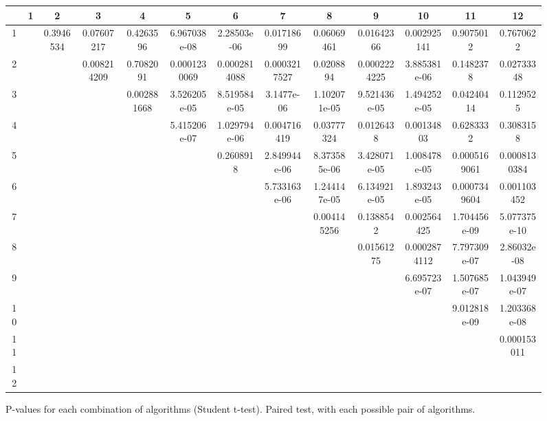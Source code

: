 \begin{landscape}
\begin{figure}
\begin{center}
	\begin{tabular}{|c|c|c|c|c|c|c|c|c|c|c|c|c|} \hline
		& 1 & 2 & 3 & 4 & 5 & 6 & 7 & 8 & 9 & 10 & 11 & 12 \\ \hline \hline
		1 & & 0.3946534 & 0.07607217 & 0.4263596 & 6.967038e-08 & 2.28503e-06 & 0.01718699 & 0.06069461 & 0.01642366 & 0.002925141 & 0.9075012 & 0.7670622 \\ \hline
		2 & & & 0.008214209 & 0.7082091 & 0.0001230069 & 0.0002814088 & 0.0003217527 & 0.0208894 & 0.0002224225 & 3.885381e-06 & 0.1482378 & 0.02733348 \\ \hline
		3 & & & & 0.002881668 & 3.526205e-05 & 8.519584e-05 & 3.1477e-06 & 1.102071e-05 & 9.521436e-05 & 1.494252e-05 & 0.04240414 & 0.1129525 \\ \hline
		4 & & & & & 5.415206e-07 & 1.029794e-06 & 0.004716419 & 0.03777324 & 0.0126438 & 0.00134803 & 0.6283332 & 0.3083158 \\ \hline
		5 & & & & & & 0.2608918 & 2.849944e-06 & 8.373585e-06 & 3.428071e-05 & 1.008478e-05 & 0.0005169061 & 0.0008130384 \\ \hline
		6 & & & & & & & 5.733163e-06 & 1.244147e-05 & 6.134921e-05 & 1.893243e-05 & 0.0007349604 & 0.001103452 \\ \hline
		7 & & & & & & & & 0.004145256 & 0.1388542 & 0.002564425 & 1.704456e-09 & 5.077375e-10 \\ \hline
		8 & & & & & & & & & 0.01561275 & 0.0002874112 & 7.797309e-07 & 2.86032e-08 \\ \hline
		9 & & & & & & & & & & 6.695723e-07 & 1.507685e-07 & 1.043949e-07 \\ \hline
		10 & & & & & & & & & & & 9.012818e-09 & 1.203368e-08 \\ \hline
		11 & & & & & & & & & & & & 0.000153011 \\ \hline
		12 & & & & & & & & & & & & \\ \hline

	
	\end{tabular}
\end{center}
\caption{P-values for each combination of algorithms (Student t-test). Paired test, with each possible pair of algorithms.}
\label{pv st}
\end{figure}


\end{landscape}
